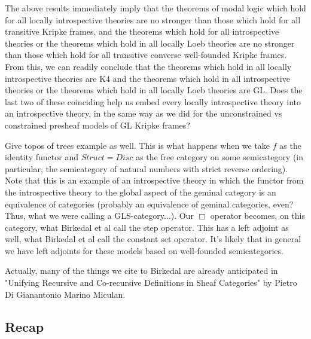 \begin{TODOblock}
The above results immediately imply that the theorems of modal logic which hold for all locally introspective theories are no stronger than those which hold for all transitive Kripke frames, and the theorems which hold for all introspective theories or the theorems which hold in all locally Loeb theories are no stronger than those which hold for all transitive converse well-founded Kripke frames. From this, we can readily conclude that the theorems which hold in all locally introspective theories are K4 and the theorems which hold in all introspective theories or the theorems which hold in all locally Loeb theories are GL. Does the last two of these coinciding help us embed every locally introspective theory into an introspective theory, in the same way as we did for the unconstrained vs constrained presheaf models of GL Kripke frames?
\end{TODOblock}


\begin{TODOblock}
Give topos of trees example as well. This is what happens when we take $f$ as the identity functor and $Struct = Disc$ as the free category on some semicategory (in particular, the semicategory of natural numbers with strict reverse ordering). Note that this is an example of an introspective theory in which the functor from the introspective theory to the global aspect of the geminal category is an equivalence of categories (probably an equivalence of geminal categories, even? Thus, what we were calling a GLS-category...). Our $\Box$ operator becomes, on this category, what Birkedal et al call the step operator. This has a left adjoint as well, what Birkedal et al call the constant set operator. It's likely that in general we have left adjoints for these models based on well-founded semicategories.

Actually, many of the things we cite to Birkedal are already anticipated in "Unifying Recursive and Co-recursive Definitions in Sheaf Categories" by Pietro Di Gianantonio Marino Miculan.
\end{TODOblock}

\subsection{Recap}
\TODO

\fileend
